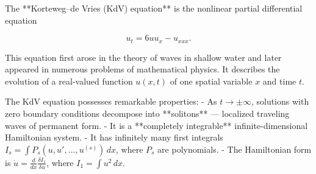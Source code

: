The **Korteweg–de Vries (KdV) equation** is the nonlinear partial differential equation

$$u_t = 6uu_x - u_{xxx}.$$

This equation first arose in the theory of waves in shallow water and later appeared in numerous problems of mathematical physics. It describes the evolution of a real-valued function $u(x, t)$ of one spatial variable $x$ and time $t$.

The KdV equation possesses remarkable properties:
- As $t \to \pm\infty$, solutions with zero boundary conditions decompose into **solitons** — localized traveling waves of permanent form.
- It is a **completely integrable** infinite-dimensional Hamiltonian system.
- It has infinitely many first integrals $I_s = \int P_s(u, u', \ldots, u^{(s)}) \, dx$, where $P_s$ are polynomials.
- The Hamiltonian form is $\dot{u} = \frac{d}{dx} \frac{\delta I_1}{\delta u}$, where $I_1 = \int u^2 \, dx$.

